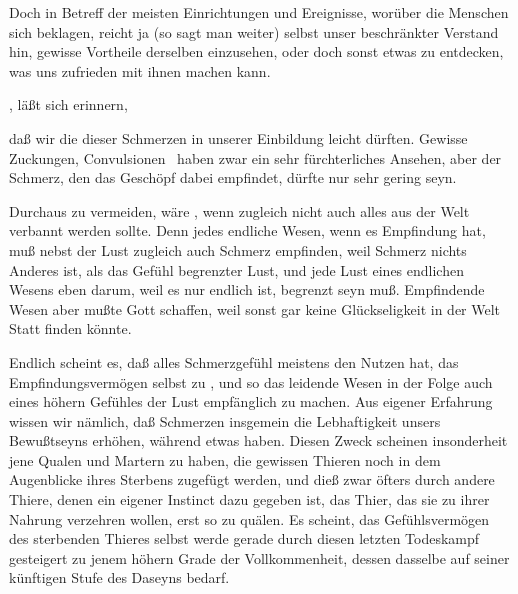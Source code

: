 \begin{aufza}\setcounter{enumi}{1}
\item Doch in Betreff der meisten Einrichtungen und Ereignisse, worüber die Menschen sich beklagen, reicht ja (so sagt man weiter) selbst unser beschränkter Verstand hin, gewisse Vortheile derselben einzusehen, oder doch sonst etwas zu entdecken, was uns zufrieden mit ihnen machen kann.
\begin{aufzb}
\item  {}, läßt sich erinnern,
\begin{aufzc}
\item  daß wir die  dieser Schmerzen in unserer Einbildung leicht  dürften. Gewisse Zuckungen, Convulsionen \udgl\  haben zwar ein sehr fürchterliches Ansehen, aber der Schmerz, den das Geschöpf dabei empfindet, dürfte nur sehr gering seyn.
\item  Durchaus  zu vermeiden, wäre , wenn zugleich nicht auch alles  aus der Welt verbannt werden sollte. Denn jedes endliche Wesen, wenn es Empfindung hat, muß nebst der Lust zugleich auch Schmerz empfinden, weil Schmerz nichts Anderes ist, als das Gefühl begrenzter Lust, und jede Lust eines endlichen Wesens eben darum, weil es nur endlich ist, begrenzt seyn muß. Empfindende Wesen aber mußte Gott schaffen, weil sonst gar keine Glückseligkeit in der Welt Statt finden könnte.
\item  Endlich scheint es, daß alles Schmerzgefühl meistens den Nutzen hat, das Empfindungsvermögen selbst zu , und so das leidende Wesen in der Folge auch eines höhern Gefühles der Lust empfänglich zu machen. Aus eigener Erfahrung wissen wir nämlich, daß Schmerzen insgemein die Lebhaftigkeit unsers Bewußtseyns erhöhen, während  etwas  haben. Diesen Zweck scheinen insonderheit jene Qualen und Martern zu haben, die gewissen Thieren noch in dem Augenblicke ihres Sterbens zugefügt werden, und dieß zwar öfters durch andere Thiere, denen ein eigener Instinct dazu gegeben ist, das Thier, das sie zu ihrer Nahrung verzehren wollen, erst so zu quälen. Es scheint, das Gefühlsvermögen des sterbenden Thieres selbst werde gerade durch diesen letzten Todeskampf gesteigert zu jenem höhern Grade der Vollkommenheit, dessen dasselbe auf seiner künftigen Stufe des Daseyns bedarf.
\end{aufzc}

\end{aufzb}
\end{aufza}
